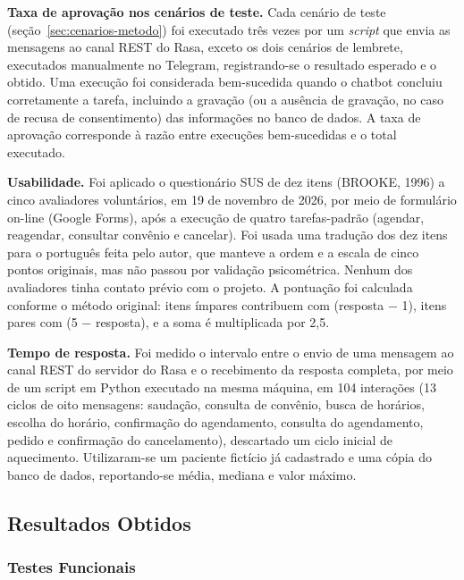 \documentclass[12pt,a4paper]{extarticle}
\begin{document}
\textbf{Taxa de aprovação nos cenários de teste.} Cada cenário de teste (seção~\ref{sec:cenarios-metodo}) foi executado três vezes por um \textit{script} que envia as mensagens ao canal REST do Rasa, exceto os dois cenários de lembrete, executados manualmente no Telegram, registrando-se o resultado esperado e o obtido. Uma execução foi considerada bem-sucedida quando o chatbot concluiu corretamente a tarefa, incluindo a gravação (ou a ausência de gravação, no caso de recusa de consentimento) das informações no banco de dados. A taxa de aprovação corresponde à razão entre execuções bem-sucedidas e o total executado.

\textbf{Usabilidade.} Foi aplicado o questionário SUS de dez itens (BROOKE, 1996) a cinco avaliadores voluntários, em 19 de novembro de 2026, por meio de formulário on-line (Google Forms), após a execução de quatro tarefas-padrão (agendar, reagendar, consultar convênio e cancelar). Foi usada uma tradução dos dez itens para o português feita pelo autor, que manteve a ordem e a escala de cinco pontos originais, mas não passou por validação psicométrica. Nenhum dos avaliadores tinha contato prévio com o projeto. A pontuação foi calculada conforme o método original: itens ímpares contribuem com (resposta $-$ 1), itens pares com (5 $-$ resposta), e a soma é multiplicada por 2,5.

\textbf{Tempo de resposta.} Foi medido o intervalo entre o envio de uma mensagem ao canal REST do servidor do Rasa e o recebimento da resposta completa, por meio de um script em Python executado na mesma máquina, em 104 interações (13 ciclos de oito mensagens: saudação, consulta de convênio, busca de horários, escolha do horário, confirmação do agendamento, consulta do agendamento, pedido e confirmação do cancelamento), descartado um ciclo inicial de aquecimento. Utilizaram-se um paciente fictício já cadastrado e uma cópia do banco de dados, reportando-se média, mediana e valor máximo.

\subsection{Resultados Obtidos}
\label{sec:resultados_obtidos}

\subsubsection{Testes Funcionais}
\label{sec:res_funcionais}
\end{document}

